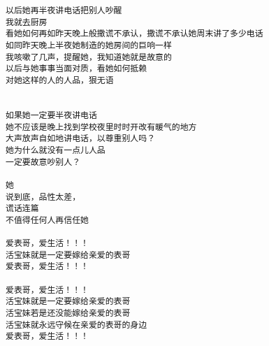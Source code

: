 \documentclass[9pt, b5paper]{article}
\begin{document}
\begin{enumerate}
\begin{verbatim}
以后她再半夜讲电话把别人吵醒
我就去厨房
看她如何再如昨天晚上般撒谎不承认，撒谎不承认她周末讲了多少电话
如同昨天晚上半夜她制造的她房间的巨响一样
我咳嗽了几声，提醒她，我知道她就是故意的
以后与她事事当面对质，看她如何抵赖
对她这样的人的人品，狠无语


如果她一定要半夜讲电话
她不应该是晚上找到学校夜里时时开改有暖气的地方
大声放声自如地讲电话，以尊重别人吗？
她为什么就没有一点儿人品
一定要故意吵别人？

她
说到底，品性太差，
谎话连篇
不值得任何人再信任她

爱表哥，爱生活！！！
活宝妹就是一定要嫁给亲爱的表哥
爱表哥，爱生活！！！

爱表哥，爱生活！！！
活宝妹就是一定要嫁给亲爱的表哥
活宝妹若是还没能嫁给亲爱的表哥
活宝妹就永远守候在亲爱的表哥的身边
爱表哥，爱生活！！！
\end{verbatim}
\end{enumerate}
\end{document}
